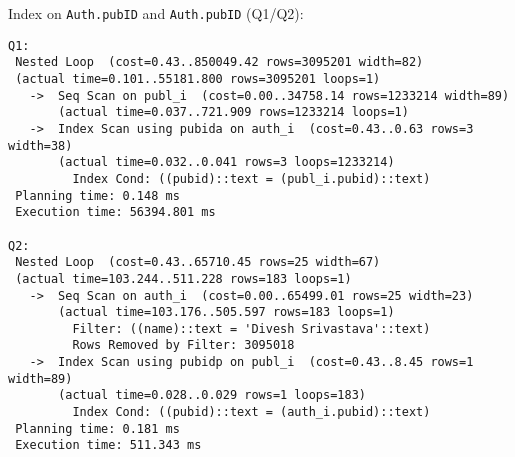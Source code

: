\documentclass[11pt]{scrartcl}
\begin{document}
\noindent Index on {\tt Auth.pubID} and {\tt Auth.pubID} (Q1/Q2):
{\small
\begin{verbatim}
Q1:
 Nested Loop  (cost=0.43..850049.42 rows=3095201 width=82)
 (actual time=0.101..55181.800 rows=3095201 loops=1)
   ->  Seq Scan on publ_i  (cost=0.00..34758.14 rows=1233214 width=89)
       (actual time=0.037..721.909 rows=1233214 loops=1)
   ->  Index Scan using pubida on auth_i  (cost=0.43..0.63 rows=3 width=38)
       (actual time=0.032..0.041 rows=3 loops=1233214)
         Index Cond: ((pubid)::text = (publ_i.pubid)::text)
 Planning time: 0.148 ms
 Execution time: 56394.801 ms

Q2:
 Nested Loop  (cost=0.43..65710.45 rows=25 width=67)
 (actual time=103.244..511.228 rows=183 loops=1)
   ->  Seq Scan on auth_i  (cost=0.00..65499.01 rows=25 width=23)
       (actual time=103.176..505.597 rows=183 loops=1)
         Filter: ((name)::text = 'Divesh Srivastava'::text)
         Rows Removed by Filter: 3095018
   ->  Index Scan using pubidp on publ_i  (cost=0.43..8.45 rows=1 width=89)
       (actual time=0.028..0.029 rows=1 loops=183)
         Index Cond: ((pubid)::text = (auth_i.pubid)::text)
 Planning time: 0.181 ms
 Execution time: 511.343 ms

\end{verbatim}
}
\end{document}
